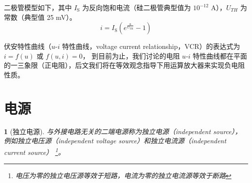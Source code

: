 \documentclass[UTF8]{report}
\theoremstyle{MyLineTheoremStyle} %
\theoremstyle{MyBlockTheoremStyle} %
\theoremstyle{MySubsubsectionStyle} %
\newtheorem{definition}{}
\begin{document}
二极管模型如下，其中 $I_{\mathrm{S}}$ 为反向饱和电流（硅二极管典型值为 $10^{-12}$ A），$U_{TH}$ 为常数（典型值 25 mV）。
\begin{equation}
i = I_{\mathrm{S}}\left(e^{\frac{u}{U_{\mathrm{TH}}}} - 1\right)
\end{equation}

伏安特性曲线（$u$-$i$ 特性曲线，voltage current relationship，VCR）的表达式为 $i = f(u)$ 或 $f(u,i) = 0$，
到目前为止，我们讨论的电阻 $u$-$i$ 特性曲线都在平面的一三象限（正电阻），后文我们将在等效观念指导下用运算放大器来实现负电阻性质。

\section{电源}


\begin{definition}[独立电源]
与外接电路无关的二端电源称为独立电源（independent source），例如独立电压源（independent voltage source）和独立电流源（independent current source）
\footnote{电压为零的独立电压源等效于短路，电流为零的独立电流源等效于断路}。
\end{definition}
\end{document}
